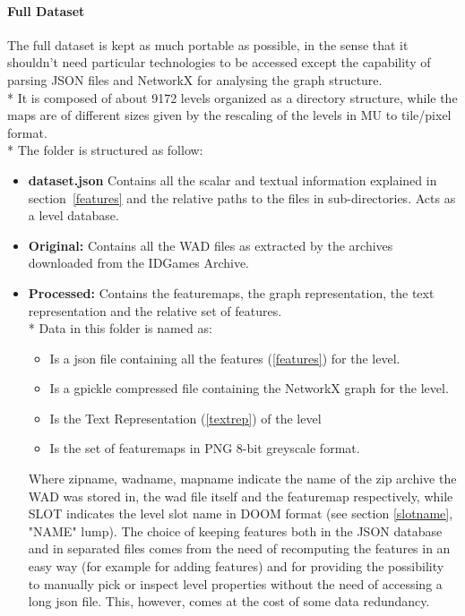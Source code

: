 \paragraph{Full Dataset} 
 The full dataset is kept as much portable as possible, in the sense that it shouldn't need particular technologies to be accessed except the capability of parsing JSON files and NetworkX \cite{networkx} for analysing the graph structure. \\*
 It is composed of about 9172 levels organized as a directory structure, while the maps are of different sizes given by the rescaling of the levels in \gls{MU} to tile/pixel format.\\*
 The folder is structured as follow:
 \begin{itemize}
 	\item \textbf{dataset.json} Contains all the scalar and textual information explained in section~\ref{features} and the relative paths to the files in sub-directories. Acts as a level database. 
 	\item \textbf{Original:} Contains all the WAD files as extracted by the archives downloaded from the IDGames Archive.
 	\item \textbf{Processed:} Contains the \glspl{featuremap}, the graph representation, the text representation and the relative set of features. \\*
 	Data in this folder is named as:
 	\begin{itemize}
		\item [\textbf{zipname\textunderscore WADNAME\textunderscore SLOT.json}] Is a json file containing all the features (\ref{features}) for the level.
		\item [\textbf{zipname\textunderscore WADNAME\textunderscore SLOT.networkx}] Is a gpickle compressed file containing the NetworkX graph for the level.
		\item [\textbf{zipname\textunderscore WADNAME\textunderscore SLOT.txt}] Is the Text Representation (\ref{textrep}) of the level
		\item [\textbf{zipname\textunderscore WADNAME\textunderscore SLOT\textunderscore mapname.txt}] Is the set of \glspl{featuremap} in PNG 8-bit greyscale format. 
 	\end{itemize}
 	Where zipname, wadname, mapname indicate the name of the zip archive the \gls{WAD} was stored in, the wad file itself and the \gls{featuremap} respectively, while SLOT indicates the level slot name in DOOM format (see section \ref{slotname}, "NAME" lump).
 	The choice of keeping features both in the JSON database and in separated files comes from the need of recomputing the features in an easy way (for example for adding features) and for providing the possibility to manually pick or inspect level properties without the need of accessing a long json file. This, however, comes at the cost of some data redundancy. 
 \end{itemize}


